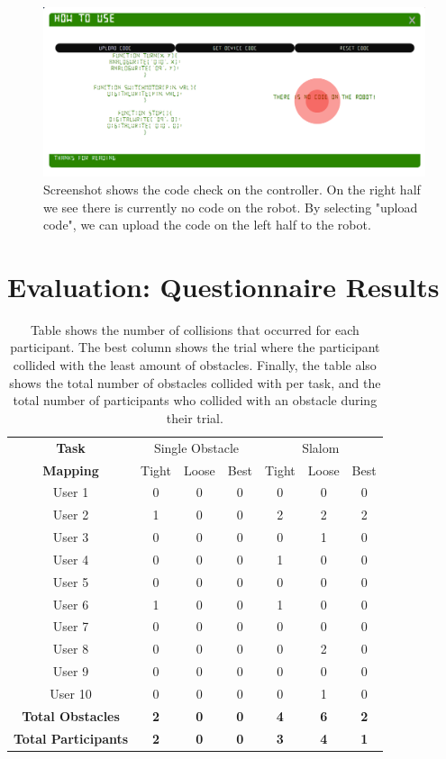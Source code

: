 \documentclass{l4proj}
\begin{document}
\begin{appendices}
\begin{figure}
    \centering
    \includegraphics[width=1\textwidth]{images/code-editor-nocode.png}
    \caption{Screenshot shows the code check on the controller. On the right half we see there is currently no code on the robot. By selecting "upload code", we can upload the code on the left half to the robot.}
    \label{fig:code-editor}
\end{figure}



\chapter{Evaluation: Questionnaire Results}

\begin{table}[!ht]
\centering
\caption{Table shows the number of collisions that occurred for each participant. The best column shows the trial where the participant collided with the least amount of obstacles. Finally, the table also shows the total number of obstacles collided with per task, and the total number of participants who collided with an obstacle during their trial.}
\label{tab:joystick-collisions}
\begin{tabular}{ccccccc}
\textbf{Task} & \multicolumn{3}{c}{Single Obstacle} & \multicolumn{3}{c}{Slalom} \\
\textbf{Mapping} & Tight & Loose & Best & Tight & Loose & Best \\
User 1 & 0 & 0 & 0 & 0 & 0 & 0 \\
User 2 & 1 & 0 & 0 & 2 & 2 & 2 \\
User 3 & 0 & 0 & 0 & 0 & 1 & 0 \\
User 4 & 0 & 0 & 0 & 1 & 0 & 0 \\
User 5 & 0 & 0 & 0 & 0 & 0 & 0 \\
User 6 & 1 & 0 & 0 & 1 & 0 & 0 \\
User 7 & 0 & 0 & 0 & 0 & 0 & 0 \\
User 8 & 0 & 0 & 0 & 0 & 2 & 0 \\
User 9 & 0 & 0 & 0 & 0 & 0 & 0 \\
User 10 & 0 & 0 & 0 & 0 & 1 & 0 \\
\textbf{Total Obstacles} & \textbf{2} & \textbf{0} & \textbf{0} & \textbf{4} & \textbf{6} & \textbf{2} \\
\textbf{Total Participants} & \textbf{2} & \textbf{0} & \textbf{0} & \textbf{3} & \textbf{4} & \textbf{1}
\end{tabular}
\end{table}


\end{appendices}
\end{document}
